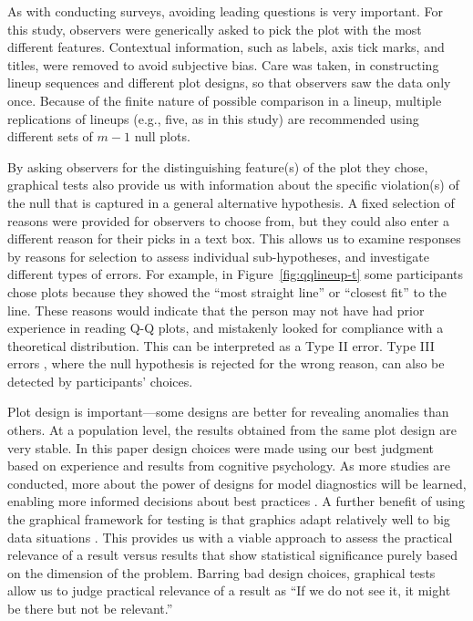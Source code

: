 \documentclass[12pt]{article} %
\newcommand{\al}[1]{{\color{ForestGreen} #1}}
\begin{document}
As with conducting surveys, avoiding leading questions is very important. For this study, observers were generically asked to pick the plot with the most different features. Contextual information, such as labels, axis tick marks, and titles, were removed to avoid subjective bias. Care was taken, in constructing lineup sequences and different plot designs, so that observers saw the data only once. Because of the finite nature of possible comparison in a lineup, multiple replications of lineups (e.g., five, as in this study) are recommended using different sets of $m-1$ null plots. 

By asking observers for the distinguishing feature(s) of the plot they chose,  graphical tests also provide us with information about the specific violation(s) of the null that is captured in a general alternative hypothesis. A fixed selection of reasons were provided for observers to choose from, but they could also enter a different reason for their picks in a text box.  This allows us to examine responses by reasons for selection to assess individual sub-hypotheses, and investigate different types of errors. For example, in Figure~\ref{fig:qqlineup-t} some participants chose plots because they showed the ``most straight line'' or ``closest fit'' to the line. These reasons would indicate that the person may not have had prior experience in reading Q-Q plots, and mistakenly looked for compliance with a theoretical distribution. This can be interpreted as a Type II error. Type III errors \citep{mosteller:1948}, where the null hypothesis is rejected for the wrong reason, can also be detected by participants' choices.


Plot design is important---some designs are better for revealing anomalies than others. At a population level, the results obtained from the same plot design are very stable. %
In this paper design choices were made using \al{our} best judgment based on  experience and results from cognitive psychology. As more studies are conducted, more about the power of designs for model diagnostics will be learned, enabling more informed decisions about best practices \citep{infovis:2012}. A further benefit of using the graphical framework for testing is that graphics adapt relatively well to big data situations \citep{unwin:million}. This provides us with a viable approach to assess the practical relevance of a result versus results that show statistical significance purely based on the dimension of the problem. Barring bad design choices, graphical tests allow us to judge practical relevance of a result as ``If we do not see it, it might be there but not be relevant.'' 
\end{document}
